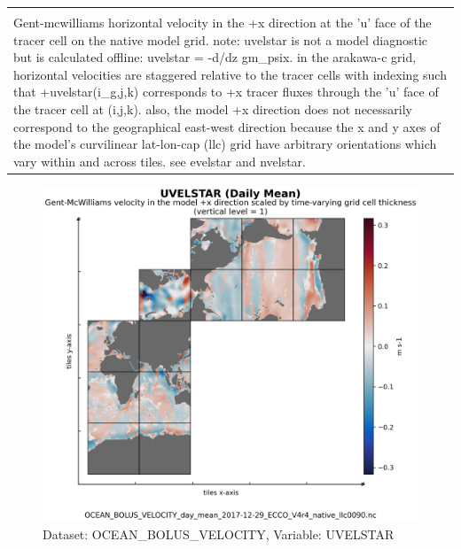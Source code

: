 \begin{longtable}{|m{}|m{}|m{}|m{}|}
{{{{{}}}}} \\ \hline
\rowcolor{lightgray} \multicolumn{4}{|c|}{\textbf{Comments}} \\ \hline
\multicolumn{4}{|p{1\textwidth}|}{\footnotesize{{Gent-mcwilliams horizontal velocity in the +x direction at the 'u' face of the tracer cell on the native model grid. note: uvelstar is not a model diagnostic but is calculated offline: uvelstar = -d/dz gm\_psix. in the arakawa-c grid, horizontal velocities are staggered relative to the tracer cells with indexing such that +uvelstar(i\_g,j,k) corresponds to +x tracer fluxes through the 'u' face of the tracer cell at (i,j,k). also, the model +x direction does not necessarily correspond to the geographical east-west direction because the x and y axes of the model's curvilinear lat-lon-cap (llc) grid have arbitrary orientations which vary within and across tiles. see evelstar and nvelstar.}}} \\ \hline
\end{longtable}

\begin{figure}[H]
\centering
\includegraphics[scale=0.55]{../images/plots/native_plots/Gent-McWilliams_Ocean_Bolus_Velocity/UVELSTAR.png}
\caption{Dataset: OCEAN\_BOLUS\_VELOCITY, Variable: UVELSTAR}
\label{tab:table-OCEAN_BOLUS_VELOCITY_UVELSTAR-Plot}
\end{figure}
\newpage
\pagebreak
